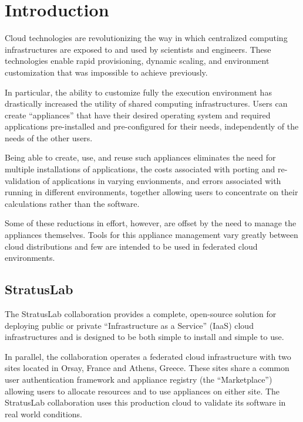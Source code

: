 \section{Introduction}
\label{sec:Introduction}

Cloud technologies are revolutionizing the way in which centralized
computing infrastructures are exposed to and used by scientists and
engineers.  These technologies enable rapid provisioning, dynamic
scaling, and environment customization that was impossible to achieve
previously. 

In particular, the ability to customize fully the execution
environment has drastically increased the utility of shared computing
infrastructures.  Users can create ``appliances'' that have their
desired operating system and required applications pre-installed
and pre-configured for their needs, independently of the needs of the
other users.

Being able to create, use, and reuse such appliances eliminates the
need for multiple installations of applications, the costs associated
with porting and re-validation of applications in varying envionments,
and errors associated with running in different environments, together
allowing users to concentrate on their calculations rather than the
software.

Some of these reductions in effort, however, are offset by the need to
manage the appliances themselves.  Tools for this appliance management
vary greatly between cloud distributions and few are intended to be
used in federated cloud environments.

\subsection{StratusLab}

The StratusLab collaboration provides a complete, open-source solution
for deploying public or private ``Infrastructure as a Service'' (IaaS)
cloud infrastructures and is designed to be both simple to install and
simple to use.~\cite{slbook}

In parallel, the collaboration operates a federated cloud
infrastructure with two sites located in Orsay, France and Athens,
Greece\@.  These sites share a common user authentication framework
and appliance registry (the ``Marketplace'') allowing users to
allocate resources and to use appliances on either site.  The
StratusLab collaboration uses this production cloud to validate its
software in real world conditions.

